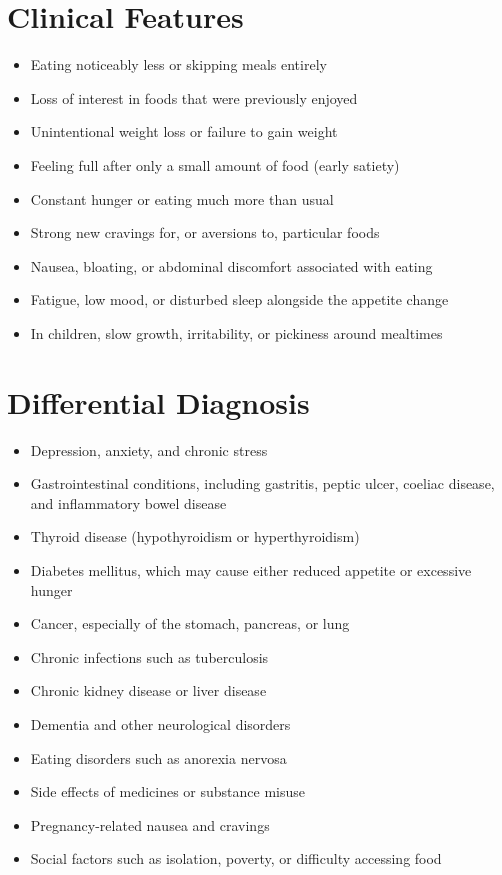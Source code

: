 \section*{Clinical Features}
\begin{itemize}
    \item Eating noticeably less or skipping meals entirely
    \item Loss of interest in foods that were previously enjoyed
    \item Unintentional weight loss or failure to gain weight
    \item Feeling full after only a small amount of food (early satiety)
    \item Constant hunger or eating much more than usual
    \item Strong new cravings for, or aversions to, particular foods
    \item Nausea, bloating, or abdominal discomfort associated with eating
    \item Fatigue, low mood, or disturbed sleep alongside the appetite change
    \item In children, slow growth, irritability, or pickiness around mealtimes
\end{itemize}

\section*{Differential Diagnosis}
\begin{itemize}
    \item Depression, anxiety, and chronic stress
    \item Gastrointestinal conditions, including gastritis, peptic ulcer, coeliac disease, and inflammatory bowel disease
    \item Thyroid disease (hypothyroidism or hyperthyroidism)
    \item Diabetes mellitus, which may cause either reduced appetite or excessive hunger
    \item Cancer, especially of the stomach, pancreas, or lung
    \item Chronic infections such as tuberculosis
    \item Chronic kidney disease or liver disease
    \item Dementia and other neurological disorders
    \item Eating disorders such as anorexia nervosa
    \item Side effects of medicines or substance misuse
    \item Pregnancy-related nausea and cravings
    \item Social factors such as isolation, poverty, or difficulty accessing food
\end{itemize}

